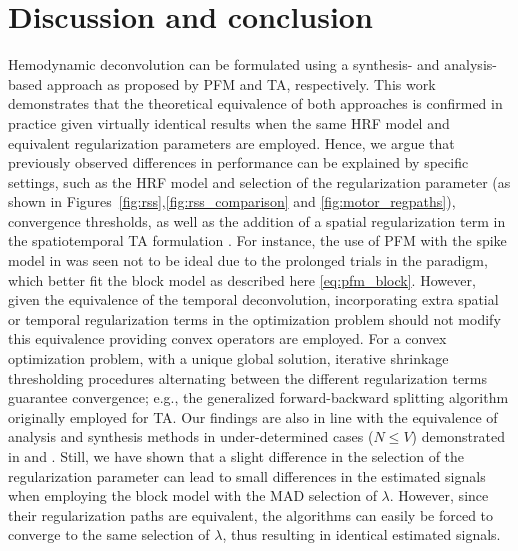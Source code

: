 
\section{Discussion and conclusion}

Hemodynamic deconvolution can be formulated using a synthesis- and
analysis-based approach as proposed by PFM and TA, respectively. This work
demonstrates that the theoretical equivalence of both approaches is confirmed in
practice given virtually identical results when the same HRF model and
equivalent regularization parameters are employed. Hence, we argue that
previously observed differences in performance can be explained by specific
settings, such as the HRF model and selection of the regularization parameter
(as shown in Figures~\ref{fig:rss},\ref{fig:rss_comparison} and
\ref{fig:motor_regpaths}), convergence thresholds, as well as the addition of a
spatial regularization term in the spatiotemporal TA formulation
\citep{Karahanoglu2013TotalactivationfMRI}. For instance, the use of PFM with
the spike model in \citep{Tan_2017} was seen not to be ideal due to the
prolonged trials in the paradigm, which better fit the block model as described
here \eqref{eq:pfm_block}. However, given the equivalence of the temporal
deconvolution, incorporating extra spatial or temporal regularization terms in
the optimization problem should not modify this equivalence providing convex
operators are employed. For a convex optimization problem, with a unique global
solution, iterative shrinkage thresholding procedures alternating between the
different regularization terms guarantee convergence; e.g., the generalized
forward-backward splitting \citep{Raguet2013GeneralizedForwardBackward}
algorithm originally employed for TA. Our findings are also in line with the
equivalence of analysis and synthesis methods in under-determined cases (\(N
\leq V\)) demonstrated in \citep{Elad2007Analysisversussynthesis} and
\citep{ortelli2019synthesis}. Still, we have shown that a slight difference in
the selection of the regularization parameter can lead to small differences in
the estimated signals when employing the block model with the MAD selection of
$\lambda$. However, since their regularization paths are equivalent, the
algorithms can easily be forced to converge to the same selection of $\lambda$,
thus resulting in identical estimated signals.

